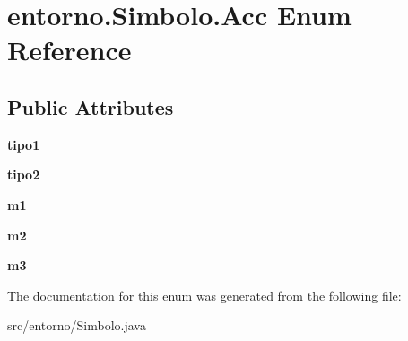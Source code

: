 \hypertarget{enumentorno_1_1_simbolo_1_1_acc}{}\section{entorno.\+Simbolo.\+Acc Enum Reference}
\label{enumentorno_1_1_simbolo_1_1_acc}
\subsection*{Public Attributes}
\begin{DoxyCompactItemize}
\item 
\mbox{\label{enumentorno_1_1_simbolo_1_1_acc_abd18e4836ad2134f041d80f5800c731a}} 
{\bfseries tipo1}
\item 
\mbox{\label{enumentorno_1_1_simbolo_1_1_acc_ad3532567460535b0b6d89f7a212c4f9f}} 
{\bfseries tipo2}
\item 
\mbox{\label{enumentorno_1_1_simbolo_1_1_acc_ac721376d3ffdc144ee08fa43276944c6}} 
{\bfseries m1}
\item 
\mbox{\label{enumentorno_1_1_simbolo_1_1_acc_a2948282532280e8bcf5ca3f40a4c8e41}} 
{\bfseries m2}
\item 
\mbox{\label{enumentorno_1_1_simbolo_1_1_acc_a9575a901d6073b2e1d394327d996cc7d}} 
{\bfseries m3}
\end{DoxyCompactItemize}


The documentation for this enum was generated from the following file\+:\begin{DoxyCompactItemize}
\item 
src/entorno/Simbolo.\+java\end{DoxyCompactItemize}
